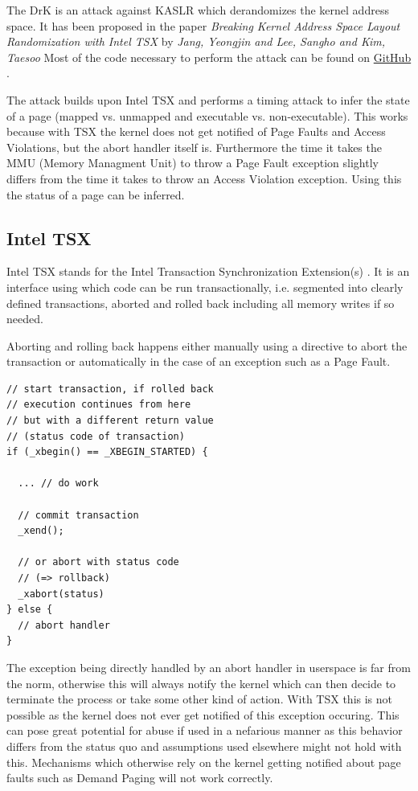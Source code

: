 The DrK is an attack against KASLR which derandomizes the kernel address space.
It has been proposed in the paper \textit{Breaking Kernel Address Space Layout Randomization with Intel TSX} by \textit{Jang, Yeongjin and Lee, Sangho and Kim, Taesoo} \cite{drk}
Most of the code necessary to perform the attack can be found on \href{https://github.com/sslab-gatech/DrK}{GitHub} \cite{drk-attack-proof-of-concept-github}.

The attack builds upon Intel TSX and performs a timing attack to infer the state of a page (mapped vs. unmapped and executable vs. non-executable).
This works because with TSX the kernel does not get notified of Page Faults and Access Violations, but the abort handler itself is.
Furthermore the time it takes the MMU (Memory Managment Unit) to throw a Page Fault exception slightly differs from the time it takes to throw an Access Violation exception.
Using this the status of a page can be inferred.

\subsection{Intel TSX}

Intel TSX stands for the Intel Transaction Synchronization Extension(s) \cite{intel-tsx-overview}.
It is an interface using which code can be run transactionally, i.e. segmented into clearly defined transactions, aborted and rolled back including all memory writes if so needed.

Aborting and rolling back happens either manually using a directive to abort the transaction or automatically in the case of an exception such as a Page Fault.

\begin{lstlisting}
// start transaction, if rolled back
// execution continues from here
// but with a different return value
// (status code of transaction)
if (_xbegin() == _XBEGIN_STARTED) {

  ... // do work

  // commit transaction
  _xend();

  // or abort with status code
  // (=> rollback)
  _xabort(status)
} else {
  // abort handler
}
\end{lstlisting}

The exception being directly handled by an abort handler in userspace is far from the norm, otherwise this will always notify the kernel which can then decide to terminate the process or take some other kind of action.
With TSX this is not possible as the kernel does not ever get notified of this exception occuring.
This can pose great potential for abuse if used in a nefarious manner as this behavior differs from the status quo and assumptions used elsewhere might not hold with this.
Mechanisms which otherwise rely on the kernel getting notified about page faults such as Demand Paging will not work correctly.


